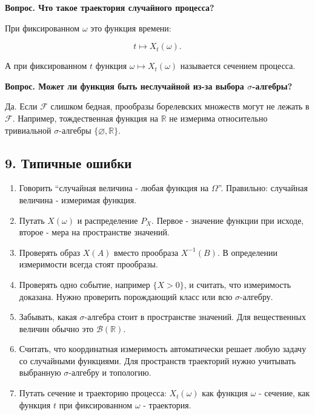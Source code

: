 \documentclass[
  11pt,
  a4paper,
]{article}
\begin{document}
\textbf{Вопрос. Что такое траектория случайного процесса?}

При фиксированном \(\omega\) это функция времени:

\[
t\mapsto X_t(\omega).
\]

А при фиксированном \(t\) функция \(\omega\mapsto X_t(\omega)\)
называется сечением процесса.

\textbf{Вопрос. Может ли функция быть неслучайной из-за выбора
\(\sigma\)-алгебры?}

Да. Если \(\mathcal F\) слишком бедная, прообразы борелевских множеств
могут не лежать в \(\mathcal F\). Например, тождественная функция на
\(\mathbb R\) не измерима относительно тривиальной \(\sigma\)-алгебры
\(\{\varnothing,\mathbb R\}\).

\subsection{9. Типичные
ошибки}\label{ux442ux438ux43fux438ux447ux43dux44bux435-ux43eux448ux438ux431ux43aux438}

\begin{enumerate}
\def\labelenumi{\arabic{enumi}.}
\item
  Говорить ``случайная величина - любая функция на \(\Omega\)''.
  Правильно: случайная величина - измеримая функция.
\item
  Путать \(X(\omega)\) и распределение \(P_X\). Первое - значение
  функции при исходе, второе - мера на пространстве значений.
\item
  Проверять образ \(X(A)\) вместо прообраза \(X^{-1}(B)\). В определении
  измеримости всегда стоят прообразы.
\item
  Проверять одно событие, например \(\{X>0\}\), и считать, что
  измеримость доказана. Нужно проверить порождающий класс или всю
  \(\sigma\)-алгебру.
\item
  Забывать, какая \(\sigma\)-алгебра стоит в пространстве значений. Для
  вещественных величин обычно это \(\mathcal B(\mathbb R)\).
\item
  Считать, что координатная измеримость автоматически решает любую
  задачу со случайными функциями. Для пространств траекторий нужно
  учитывать выбранную \(\sigma\)-алгебру и топологию.
\item
  Путать сечение и траекторию процесса: \(X_t(\omega)\) как функция
  \(\omega\) - сечение, как функция \(t\) при фиксированном \(\omega\) -
  траектория.
\end{enumerate}
\end{document}
